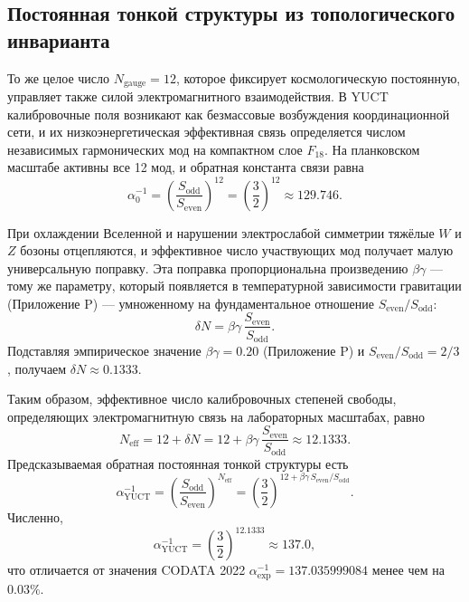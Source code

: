 \documentclass[12pt,a4paper]{article}
\begin{document}
	\subsection{Постоянная тонкой структуры из топологического инварианта}
	
	То же целое число \(N_{\mathrm{gauge}} = 12\), которое фиксирует космологическую постоянную, управляет также силой электромагнитного взаимодействия.  
	В YUCT калибровочные поля возникают как безмассовые возбуждения координационной сети, и их низкоэнергетическая эффективная связь определяется числом независимых гармонических мод на компактном слое \(F_{18}\).  
	На планковском масштабе активны все 12 мод, и обратная константа связи равна
	\begin{equation}
		\alpha_0^{-1} = \left( \frac{S_{\mathrm{odd}}}{S_{\mathrm{even}}} \right)^{12}
		= \left( \frac{3}{2} \right)^{12} \approx 129.746 .
	\end{equation}
	
	При охлаждении Вселенной и нарушении электрослабой симметрии тяжёлые \(W\) и \(Z\) бозоны отцепляются, и эффективное число участвующих мод получает малую универсальную поправку.  
	Эта поправка пропорциональна произведению \(\beta\gamma\) — тому же параметру, который появляется в температурной зависимости гравитации (Приложение P) — умноженному на фундаментальное отношение \(S_{\mathrm{even}}/S_{\mathrm{odd}}\):
	\begin{equation}
		\delta N = \beta\gamma \, \frac{S_{\mathrm{even}}}{S_{\mathrm{odd}}} .
		\label{eq:deltaN}
	\end{equation}
	Подставляя эмпирическое значение \(\beta\gamma = 0.20\) (Приложение P) и \(S_{\mathrm{even}}/S_{\mathrm{odd}} = 2/3\), получаем \(\delta N \approx 0.1333\).
	
	Таким образом, эффективное число калибровочных степеней свободы, определяющих электромагнитную связь на лабораторных масштабах, равно
	\begin{equation}
		N_{\mathrm{eff}} = 12 + \delta N = 12 + \beta\gamma\,\frac{S_{\mathrm{even}}}{S_{\mathrm{odd}}} \approx 12.1333 .
	\end{equation}
	Предсказываемая обратная постоянная тонкой структуры есть
	\begin{equation}
		\boxed{\alpha^{-1}_{\mathrm{YUCT}} = \left( \frac{S_{\mathrm{odd}}}{S_{\mathrm{even}}} \right)^{N_{\mathrm{eff}}}
			= \left( \frac{3}{2} \right)^{12 + \beta\gamma\,S_{\mathrm{even}}/S_{\mathrm{odd}}} } .
		\label{eq:alphaYUCT}
	\end{equation}
	Численно,
	\[
	\alpha^{-1}_{\mathrm{YUCT}} = \left( \frac{3}{2} \right)^{12.1333} \approx 137.0 ,
	\]
	что отличается от значения CODATA 2022 \(\alpha^{-1}_{\mathrm{exp}} = 137.035999084\) менее чем на \(0.03\%\).
	
\end{document}

